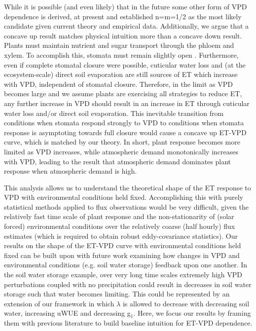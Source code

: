 \documentclass[draft]{agujournal2019}
\begin{document}
While it is possible (and even likely) that in the future some other
form of VPD dependence is derived, at present \cite{MEDLYN_2011} and
\cite{Zhou_2014} established n=m=1/2 as the most likely candidate
given current theory and empirical data. Additionally, we argue that a
concave up result matches physical intuition more than a concave down
result. Plants must maintain nutrient and sugar transport through the
phloem and xylem. To accomplish this, stomata must remain slightly
open \cite{De_2013, Nikinmaa_2013, Ryan_2014}. Furthermore, even if
complete stomatal closure were possible, cuticular water loss and (at
the ecosystem-scale) direct soil evaporation are still sources of ET
which increase with VPD, independent of stomatal closure. Therefore,
in the limit as VPD becomes large and we assume plants are exercising
all strategies to reduce ET, any further increase in VPD should result
in an increase in ET through cuticular water loss and/or direct soil
evaporation. This inevitable transition from conditions when stomata
respond strongly to VPD to conditions when stomata response is
asymptoting towards full closure would cause a concave up ET-VPD
curve, which is matched by our theory. In short, plant response
becomes more limited as VPD increases, while atmospheric demand
monotonically increases with VPD, leading to the result that
atmospheric demand dominates plant response when atmospheric demand is
high.

This analysis allows us to understand the theoretical shape of the ET
response to VPD with environmental conditions held
fixed. Accomplishing this with purely statistical methods applied to
flux observations would be very difficult, given the relatively fast
time scale of plant response and the non-stationarity of (solar
forced) environmental conditions over the relatively coarse (half
hourly) flux estimates (which is required to obtain robust
eddy-covariance statistics). Our results on the shape of the ET-VPD
curve with environmental conditions held fixed can be built upon with
future work examining how changes in VPD and environmental conditions
(e.g. soil water storage) feedback upon one another. In the soil water
storage example, over very long time scales extremely high VPD
perturbations coupled with no precipitation could result in decreases
in soil water storage such that water becomes limiting. This could be
represented by an extension of our framework in which $\lambda$ is
allowed to decrease with decreasing soil water, increasing uWUE and
decreasing g$_1$. Here, we focus our results by framing them with
previous literature to build baseline intuition for ET-VPD dependence.
\end{document}

